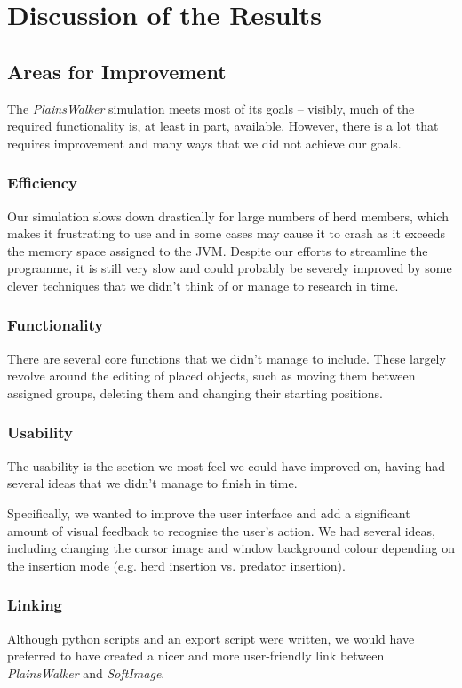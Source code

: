 \section{Discussion of the Results}

\subsection{Areas for Improvement}

The \emph{PlainsWalker} simulation meets most of its goals -- visibly, much of the required functionality is, at least in part, available. However, there is a lot that requires improvement and many ways that we did not achieve our goals.

\subsubsection{Efficiency}
Our simulation slows down drastically for large numbers of herd members, which makes it frustrating to use and in some cases may cause it to crash as it exceeds the memory space assigned to the JVM. Despite our efforts to streamline the programme, it is still very slow and could probably be severely improved by some clever techniques that we didn't think of or manage to research in time.

\subsubsection{Functionality}
There are several core functions that we didn't manage to include. These largely revolve around the editing of placed objects, such as moving them between assigned groups, deleting them and changing their starting positions.

\subsubsection{Usability}
The usability is the section we most feel we could have improved on, having had several ideas that we didn't manage to finish in time.

\noindent Specifically, we wanted to improve the user interface and add a significant amount of visual feedback to recognise the user's action. We had several ideas, including changing the cursor image and window background colour depending on the insertion mode (e.g. herd insertion vs. predator insertion). 

\subsubsection{Linking}
Although python scripts and an export script were written, we would have preferred to have created a nicer and more user-friendly link between \emph{PlainsWalker} and \emph{SoftImage}.